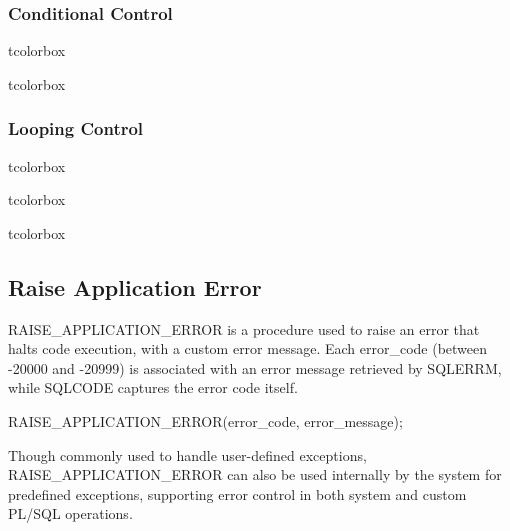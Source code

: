 \subsubsection{Conditional Control}
\begin{tcolorbox}[title = If] 
    tcolorbox
\end{tcolorbox}
\begin{tcolorbox}[title = Switch Case]
    tcolorbox
\end{tcolorbox}
\subsubsection{Looping Control}
\begin{tcolorbox}[title = Simple Loop] 
    tcolorbox
\end{tcolorbox}
\begin{tcolorbox}[title = While Loop]
    tcolorbox
\end{tcolorbox}
\begin{tcolorbox}[title = For Loop]
    tcolorbox
\end{tcolorbox}
\subsection{Raise Application Error}
\begin{tcolorbox}[title = Raise Errors] 
RAISE\_APPLICATION\_ERROR is a procedure used to raise an error that halts code execution, with a custom error
message. Each error\_code (between -20000 and -20999) is associated with an error message retrieved 
by SQLERRM, while SQLCODE captures the error code itself.

\begin{center}
RAISE\_APPLICATION\_ERROR(error\_code, error\_message);
\end{center}

Though commonly used to handle user-defined exceptions, RAISE\_APPLICATION\_ERROR can also be used internally
by the system for predefined exceptions, supporting error control in both system and custom PL/SQL operations.
\end{tcolorbox}


